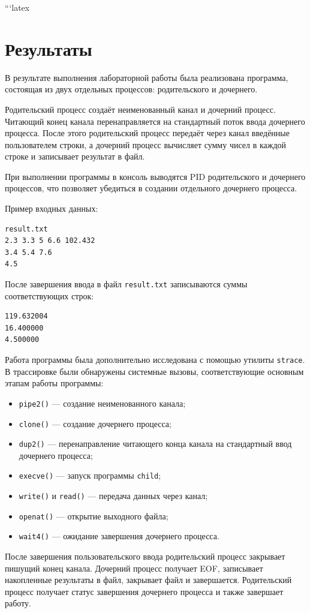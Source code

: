 ```latex
\section{Результаты}

В результате выполнения лабораторной работы была реализована программа,
состоящая из двух отдельных процессов: родительского и дочернего.

Родительский процесс создаёт неименованный канал и дочерний процесс.
Читающий конец канала перенаправляется на стандартный поток ввода
дочернего процесса. После этого родительский процесс передаёт через канал
введённые пользователем строки, а дочерний процесс вычисляет сумму чисел
в каждой строке и записывает результат в файл.

При выполнении программы в консоль выводятся PID родительского и
дочернего процессов, что позволяет убедиться в создании отдельного
дочернего процесса.

Пример входных данных:

\begin{lstlisting}
result.txt
2.3 3.3 5 6.6 102.432
3.4 5.4 7.6
4.5
\end{lstlisting}

После завершения ввода в файл \texttt{result.txt} записываются суммы
соответствующих строк:

\begin{lstlisting}
119.632004
16.400000
4.500000
\end{lstlisting}

Работа программы была дополнительно исследована с помощью утилиты
\texttt{strace}. В трассировке были обнаружены системные вызовы,
соответствующие основным этапам работы программы:

\begin{itemize}
    \item \texttt{pipe2()} --- создание неименованного канала;
    \item \texttt{clone()} --- создание дочернего процесса;
    \item \texttt{dup2()} --- перенаправление читающего конца канала
    на стандартный ввод дочернего процесса;
    \item \texttt{execve()} --- запуск программы \texttt{child};
    \item \texttt{write()} и \texttt{read()} --- передача данных
    через канал;
    \item \texttt{openat()} --- открытие выходного файла;
    \item \texttt{wait4()} --- ожидание завершения дочернего процесса.
\end{itemize}

После завершения пользовательского ввода родительский процесс закрывает
пишущий конец канала. Дочерний процесс получает EOF, записывает
накопленные результаты в файл, закрывает файл и завершается. Родительский
процесс получает статус завершения дочернего процесса и также завершает
работу.